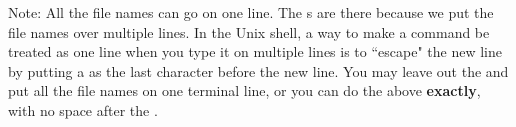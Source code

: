 \documentclass[11pt]{report}
\begin{document}
\noindent Note:  All the file names can go on one line. The s are there because we put the file names over multiple lines.  In the Unix shell, a
way to make a command be treated as one line when you type it on multiple lines is to ``escape" the new line by putting a  as the last character before the new line.  You may leave out the  and put all the file names on one terminal line, or you can do the above
\textbf{exactly}, with no space after the .
\end{document}
